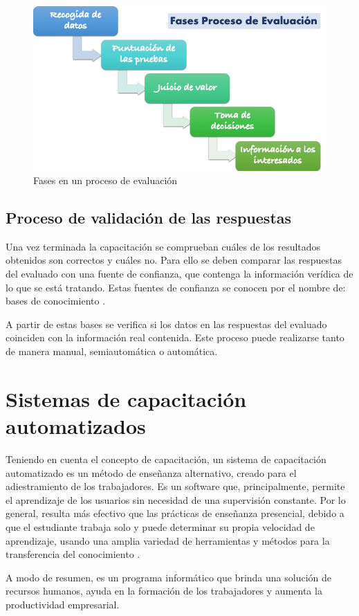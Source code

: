 \begin{figure}[h]
\centering
 \includegraphics[width=0.6\linewidth]{imagen/fases-proceso-evaluacion.jpg}
 \caption{Fases en un proceso de evaluación}
 \label{fig:fases-evaluacion} 
\end{figure}

\subsection{Proceso de validación de las respuestas}
Una vez terminada la capacitación se comprueban cuáles de los resultados obtenidos son correctos y cuáles no. Para ello se deben comparar las respuestas del evaluado con una fuente de confianza, que contenga la información verídica de lo que se está tratando. Estas fuentes de confianza se conocen por el nombre de: bases de conocimiento \cite{Rasheed2021}.

A partir de estas bases se verifica si los datos en las respuestas del evaluado coinciden con la información real contenida. Este proceso puede realizarse tanto de manera manual, semiautomática o automática.


\section{Sistemas de capacitación automatizados}
Teniendo en cuenta el concepto de capacitación, un sistema de capacitación automatizado es un método de enseñanza alternativo, creado para el adiestramiento de los trabajadores. Es un software que, principalmente, permite el aprendizaje de los usuarios sin necesidad de una supervisión constante. Por lo general, resulta más efectivo que las prácticas de enseñanza presencial, debido a que el estudiante trabaja solo y puede determinar su propia velocidad de aprendizaje, usando una amplia variedad de herramientas y métodos para la transferencia del conocimiento \cite{ISEM2022}.

A modo de resumen, es un programa informático que brinda una solución de recursos humanos, ayuda en la formación de los trabajadores y aumenta la productividad empresarial.

